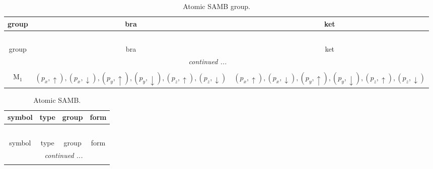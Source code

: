 \documentclass[fleqn,10pt,landscape]{article}
\begin{document}
\begin{itemize}
\begin{dmath*}
\end{dmath*}
\begin{center}
\renewcommand{\arraystretch}{1.3}
\begin{longtable}{c|c|c}
\caption{Atomic SAMB group.}
 \\
 \hline \hline
group & bra & ket \\ \hline \endfirsthead

\multicolumn{2}{l}{\tablename\ \thetable{}} \\
 \hline \hline
group & bra & ket \\ \hline \endhead

 \hline \hline
\multicolumn{2}{r}{\footnotesize\it continued ...} \\ \endfoot

 \hline \hline
\multicolumn{2}{r}{} \\ \endlastfoot

M$_{1}$ & $(p_{x},\uparrow), (p_{x},\downarrow), (p_{y},\uparrow), (p_{y},\downarrow), (p_{z},\uparrow), (p_{z},\downarrow)$ & $(p_{x},\uparrow), (p_{x},\downarrow), (p_{y},\uparrow), (p_{y},\downarrow), (p_{z},\uparrow), (p_{z},\downarrow)$ \\
\end{longtable}
\end{center}
\begin{center}
\renewcommand{\arraystretch}{1.3}
\begin{longtable}{c|c|c|c}
\caption{Atomic SAMB.}
 \\
 \hline \hline
symbol & type & group & form \\ \hline \endfirsthead

\multicolumn{3}{l}{\tablename\ \thetable{}} \\
 \hline \hline
symbol & type & group & form \\ \hline \endhead

 \hline \hline
\multicolumn{3}{r}{\footnotesize\it continued ...} \\ \endfoot


\end{longtable}
\end{center}
\end{itemize}
\end{document}
